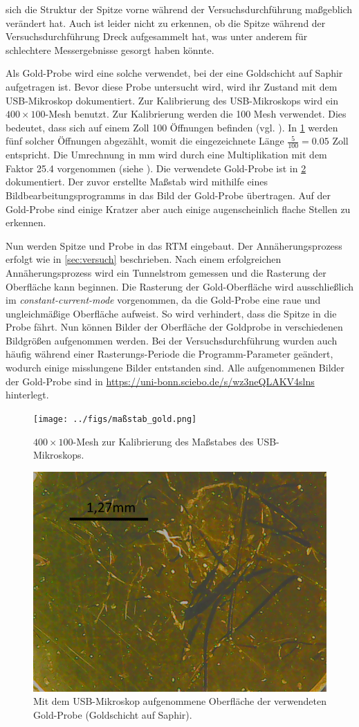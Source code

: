 sich die Struktur der Spitze vorne während der Versuchsdurchführung maßgeblich verändert hat. Auch ist leider nicht zu erkennen, ob die Spitze
während der Versuchsdurchführung Dreck aufgesammelt hat, was unter anderem für schlechtere Messergebnisse gesorgt haben könnte.\par
Als Gold-Probe wird eine solche verwendet, bei der eine Goldschicht auf Saphir aufgetragen ist. Bevor diese Probe untersucht wird, wird
ihr Zustand mit dem USB-Mikroskop dokumentiert. Zur Kalibrierung des USB-Mikroskops wird ein $400 \times 100$-Mesh benutzt. Zur Kalibrierung werden
die \num{100} Mesh verwendet. Dies bedeutet, dass sich auf einem Zoll \num{100} Öffnungen befinden (vgl. \cite{mesh}). In \cref{fig:maßstab_gold} werden fünf solcher
Öffnungen abgezählt, womit die eingezeichnete Länge $\frac{5}{100} = \num{0,05}$ Zoll entspricht. Die Umrechnung in \unit{\milli \meter} wird durch eine
Multiplikation mit dem Faktor \num{25,4} vorgenommen (siehe \cite{umrechnung}). Die verwendete Gold-Probe ist in \cref{fig:gold_saphir} dokumentiert.
Der zuvor erstellte Maßstab wird mithilfe eines Bildbearbeitungsprogramms in das Bild der Gold-Probe übertragen. Auf der Gold-Probe sind einige Kratzer
aber auch einige augenscheinlich flache Stellen zu erkennen.\par
Nun werden Spitze und Probe in das RTM eingebaut. Der Annäherungsprozess erfolgt wie in \cref{sec:versuch} beschrieben. Nach einem erfolgreichen
Annäherungsprozess wird ein Tunnelstrom gemessen und die Rasterung der Oberfläche kann beginnen. Die Rasterung der Gold-Oberfläche wird ausschließlich
im \textit{constant-current-mode} vorgenommen, da die Gold-Probe eine raue und ungleichmäßige Oberfläche aufweist. So wird verhindert, dass die
Spitze in die Probe fährt. Nun können Bilder der Oberfläche der Goldprobe in verschiedenen Bildgrößen aufgenommen werden. Bei der Versuchsdurchführung
wurden auch häufig während einer Rasterungs-Periode die Programm-Parameter geändert, wodurch einige misslungene Bilder entstanden sind.
Alle aufgenommenen Bilder der
Gold-Probe sind in \url{https://uni-bonn.sciebo.de/s/wz3neQLAKV4slns} hinterlegt.
\begin{figure}[H]
	\centering
	\texttt{[image: ../figs/maßstab\_gold.png]}
	\caption{$400 \times 100$-Mesh zur Kalibrierung des Maßstabes des USB-Mikroskops.}
	\label{fig:maßstab_gold}
\end{figure}
\begin{figure}[H]
	\centering
	\includegraphics[width=0.6\linewidth]{../figs/gold_saphir.png}
	\caption{Mit dem USB-Mikroskop aufgenommene Oberfläche der verwendeten Gold-Probe (Goldschicht auf Saphir).}
	\label{fig:gold_saphir}
\end{figure}
